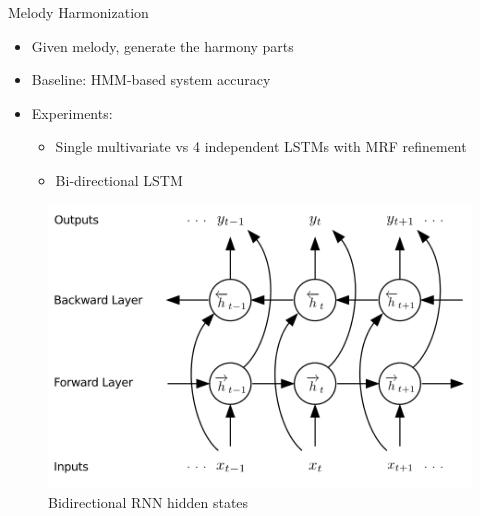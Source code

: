 \documentclass[final]{beamer}
\newlength{\onecolwid}
\newlength{\twocolwid}
\begin{document}
\begin{frame}[t]
\begin{columns}[t]
\begin{column}{\twocolwid}
\begin{columns}[t,totalwidth=\twocolwid]
\begin{column}{\onecolwid}
\begin{block}{Melody Harmonization}
  \begin{itemize}
    \item Given melody, generate the harmony parts
    \item Baseline: HMM-based system\cite{allan2005harmonising} accuracy
    \item Experiments:
      \begin{itemize}
        \item Single multivariate vs 4 independent LSTMs with MRF refinement
        \item Bi-directional LSTM
      \end{itemize}
  \end{itemize}

  \begin{figure}
    \includegraphics[width=0.8\linewidth]{Figures/bidir.png}
    \caption{Bidirectional RNN hidden states}
  \end{figure}

\end{block}


\end{column} %

\end{columns} %





\end{column}
\end{columns}
\end{frame}
\end{document}
